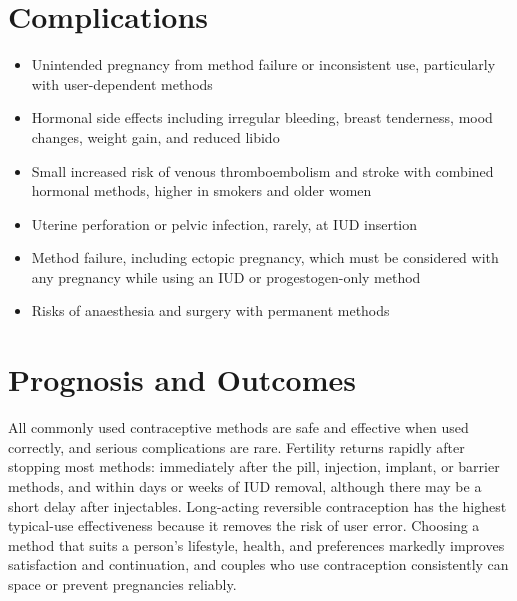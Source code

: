\section*{Complications}
\begin{itemize}
    \item Unintended pregnancy from method failure or inconsistent use, particularly with user-dependent methods
    \item Hormonal side effects including irregular bleeding, breast tenderness, mood changes, weight gain, and reduced libido
    \item Small increased risk of venous thromboembolism and stroke with combined hormonal methods, higher in smokers and older women
    \item Uterine perforation or pelvic infection, rarely, at IUD insertion
    \item Method failure, including ectopic pregnancy, which must be considered with any pregnancy while using an IUD or progestogen-only method
    \item Risks of anaesthesia and surgery with permanent methods
\end{itemize}

\section*{Prognosis and Outcomes}
All commonly used contraceptive methods are safe and effective when used correctly, and serious complications are rare. Fertility returns rapidly after stopping most methods: immediately after the pill, injection, implant, or barrier methods, and within days or weeks of IUD removal, although there may be a short delay after injectables. Long-acting reversible contraception has the highest typical-use effectiveness because it removes the risk of user error. Choosing a method that suits a person's lifestyle, health, and preferences markedly improves satisfaction and continuation, and couples who use contraception consistently can space or prevent pregnancies reliably.

